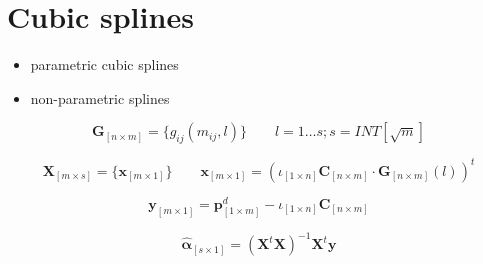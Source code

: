 \section{Cubic splines}
\label{sec:cubic-splines}

\begin{itemize}
\item parametric cubic splines \cite{McCulloch1971, McCulloch1975}
\item non-parametric splines \cite{Adams1994,Fisher1995, Waggoner1997, Tanggaard1997, Shea1985}
\end{itemize}


	$$\bm{G}_{\left[n \times m\right]} = \{  g_{ij}(m_{ij},l) \} \qquad   l = 1\dots s ; s= INT[\sqrt{m}]$$

	

	$$\bm{X}_{\left[m \times s\right]}=\{ \bm{x}_{\left[m \times 1\right]} \} \qquad  \bm{x}_{\left[m \times 1\right]} = \left( \iota_{\left[1\times n\right]} \bm{C}_{\left[n\times m\right]} \cdot \bm{G}_{\left[n\times m\right]}(l) \right)^t$$

	

	$$\bm{y}_{\left[m \times 1\right]}=  \bm{p}^d_{\left[1\times m\right]}  - \iota_{\left[1\times n\right]} \bm{C}_{\left[n\times m\right]}   $$

	

	$$\bm{\hat \alpha}_{\left[s \times 1\right]}= \left( \bm{X}^t   \bm{X}\right )^{-1}\bm{X}^t \bm{y}$$



